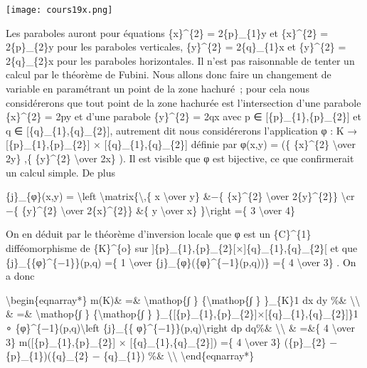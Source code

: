 \documentclass[]{article}
\begin{document}
\texttt{[image: cours19x.png]}

Les paraboles auront pour équations \{x\}\^{}\{2\} = 2\{p\}\_\{1\}y et
\{x\}\^{}\{2\} = 2\{p\}\_\{2\}y pour les paraboles verticales,
\{y\}\^{}\{2\} = 2\{q\}\_\{1\}x et \{y\}\^{}\{2\} = 2\{q\}\_\{2\}x pour
les paraboles horizontales. Il n'est pas raisonnable de tenter un calcul
par le théorème de Fubini. Nous allons donc faire un changement de
variable en paramétrant un point de la zone hachuré~; pour cela nous
considérerons que tout point de la zone hachurée est l'intersection
d'une parabole \{x\}\^{}\{2\} = 2py et d'une parabole \{y\}\^{}\{2\} =
2qx avec p ∈ {[}\{p\}\_\{1\},\{p\}\_\{2\}{]} et q ∈
{[}\{q\}\_\{1\},\{q\}\_\{2\}{]}, autrement dit nous considérerons
l'application φ : K → {[}\{p\}\_\{1\},\{p\}\_\{2\}{]} ×
{[}\{q\}\_\{1\},\{q\}\_\{2\}{]} définie par φ(x,y) = (\{ \{x\}\^{}\{2\}
\textbackslash{}over 2y\} ,\{ \{y\}\^{}\{2\} \textbackslash{}over 2x\}
). Il est visible que φ est bijective, ce que confirmerait un calcul
simple. De plus

\{j\}\_\{φ\}(x,y) = \textbackslash{}left
\textbar{}\textbackslash{}matrix\{\textbackslash{},\{ x
\textbackslash{}over y\} \&−\{ \{x\}\^{}\{2\} \textbackslash{}over
2\{y\}\^{}\{2\}\} \textbackslash{}cr −\{ \{y\}\^{}\{2\}
\textbackslash{}over 2\{x\}\^{}\{2\}\} \&\{ y \textbackslash{}over x\}
\}\textbackslash{}right \textbar{} =\{ 3 \textbackslash{}over 4\}

On en déduit par le théorème d'inversion locale que φ est un
\{C\}\^{}\{1\} difféomorphisme de \{K\}\^{}\{o\} sur
{]}\{p\}\_\{1\},\{p\}\_\{2\}{[}×{]}\{q\}\_\{1\},\{q\}\_\{2\}{[} et que
\{j\}\_\{\{φ\}\^{}\{−1\}\}(p,q) =\{ 1 \textbackslash{}over
\{j\}\_\{φ\}(\{φ\}\^{}\{−1\}(p,q))\} =\{ 4 \textbackslash{}over 3\} . On
a donc

\textbackslash{}begin\{eqnarray*\} m(K)\& =\& \textbackslash{}mathop\{∫
\} \{\textbackslash{}mathop\{∫ \} \}\_\{K\}1 dx dy \%\&
\textbackslash{}\textbackslash{} \& =\& \textbackslash{}mathop\{∫ \}
\{\textbackslash{}mathop\{∫ \}
\}\_\{{[}\{p\}\_\{1\},\{p\}\_\{2\}{]}×{[}\{q\}\_\{1\},\{q\}\_\{2\}{]}\}1
∘ \{φ\}\^{}\{−1\}(p,q)\textbackslash{}left \textbar{}\{j\}\_\{\{
φ\}\^{}\{−1\}\}(p,q)\textbackslash{}right \textbar{} dp dq\%\&
\textbackslash{}\textbackslash{} \& =\&\{ 4 \textbackslash{}over 3\}
m({[}\{p\}\_\{1\},\{p\}\_\{2\}{]} × {[}\{q\}\_\{1\},\{q\}\_\{2\}{]}) =\{
4 \textbackslash{}over 3\} (\{p\}\_\{2\} − \{p\}\_\{1\})(\{q\}\_\{2\} −
\{q\}\_\{1\}) \%\& \textbackslash{}\textbackslash{}
\textbackslash{}end\{eqnarray*\}
\end{document}
